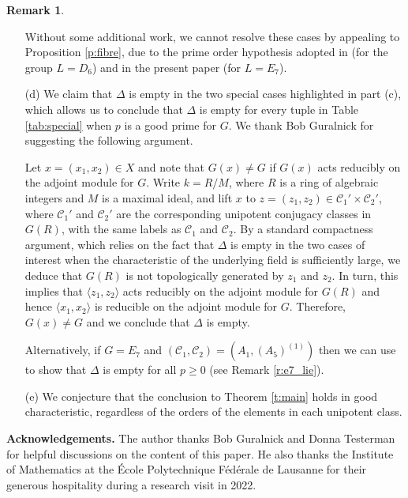 \documentclass[twoside,a4paper,reqno,11pt]{amsart}
\newcommand{\<}{\langle}
\renewcommand{\>}{\rangle}
\newcommand{\la}{\langle}
\newcommand{\ra}{\rangle}
\newcommand{\geqs}{\geqslant}
\newcommand{\vs}{\vspace{3mm}}
\renewcommand{\:}{\colon}
\theoremstyle{plain}
\theoremstyle{definition}
\newtheorem{remk}{Remark}
\begin{document}
\begin{remk}
\begin{itemize}
\vspace{1mm}

\noindent Without some additional work, we cannot resolve these cases by appealing to Proposition \ref{p:fibre}, due to the prime order hypothesis adopted in \cite[Theorem 7]{BGG2} (for the group $L=D_6$) and in the present paper (for $L = E_7$). 

\item[{\rm (d)}] We claim that $\Delta$ is empty in the two special cases highlighted in part (c), which allows us to conclude that $\Delta$ is empty for every tuple in Table \ref{tab:special} when $p$ is a good prime for $G$. We thank Bob Guralnick for suggesting the following argument. 

Let $x = (x_1,x_2) \in X$ and note that $G(x) \ne G$ if $G(x)$ acts reducibly on the adjoint module for $G$. Write $k = R/M$, where $R$ is a ring of algebraic integers and $M$ is a maximal ideal, and lift  $x$ to $z = (z_1,z_2) \in \mathcal{C}_1' \times \mathcal{C}_2'$, where $\mathcal{C}_1'$ and $\mathcal{C}_2'$ are the corresponding unipotent conjugacy classes in $G(R)$, with the same labels as $\mathcal{C}_1$ and $\mathcal{C}_2$. By a standard compactness argument, which relies on the fact that $\Delta$ is empty in the two cases of interest when the characteristic of the underlying field is sufficiently large, we deduce that $G(R)$ is not topologically generated by $z_1$ and $z_2$. In turn, this implies that $\la z_1,z_2\ra$ acts reducibly on the adjoint module for $G(R)$ and hence $\la x_1, x_2\ra$ is reducible on the adjoint module for $G$. Therefore, $G(x) \ne G$ and we conclude that $\Delta$ is empty.

Alternatively, if $G = E_7$ and $(\mathcal{C}_1,\mathcal{C}_2) = (A_1,(A_5)^{(1)})$ then we can use \cite[Corollary 3.20]{BGG2} to show that $\Delta$ is empty for all $p \geqs 0$ (see Remark \ref{r:e7_lie}).

\item[{\rm (e)}] We conjecture that the conclusion to Theorem \ref{t:main} holds in good characteristic, regardless of the orders of the elements in each unipotent class.
\end{itemize}
\end{remk}

\vs

\noindent \textbf{Acknowledgements.} The author thanks Bob Guralnick and Donna Testerman  for helpful discussions on the content of this paper. He also thanks the Institute of Mathematics at the \'{E}cole Polytechnique F\'{e}d\'{e}rale de Lausanne for their generous hospitality during a research visit in 2022.
\end{document}
